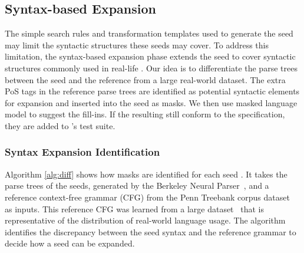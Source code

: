 \subsection{Syntax-based \Sent Expansion}

The simple search rules and transformation templates used to generate
the seed \sents may limit the syntactic structures these seeds may
cover. To address this limitation, the syntax-based \sent expansion
phase extends the seed \sents to cover syntactic structures
commonly used in real-life \sents. Our idea is to differentiate the
parse trees between the seed \sents and the reference \sents
from a large real-world dataset. The extra PoS tags in the reference
parse trees are identified as potential syntactic elements for
expansion and inserted into the seed \sents as masks. We then use
masked language model to suggest the fill-ins. If the resulting
\sents still conform to the \lc specification,
they are added to \tool{}'s test suite.

\subsubsection{Syntax Expansion Identification}

Algorithm \ref{alg:diff} shows how masks are identified for each seed
\sent.  It takes the parse trees of the seeds, generated by the
Berkeley Neural
Parser~\cite{kitaev2018seedparser,kitaev2019seedparser}, and a
reference context-free grammar (CFG) from the Penn Treebank corpus
dataset~\cite{mitchell1993treebank} as inputs.  
This reference CFG was learned from a large dataset~\cite{nltkTreebankCorporaWebPage} that is representative of the distribution of real-world language usage.  
The algorithm identifies the discrepancy between the seed syntax 
and the reference grammar to decide how a seed can be expanded.



